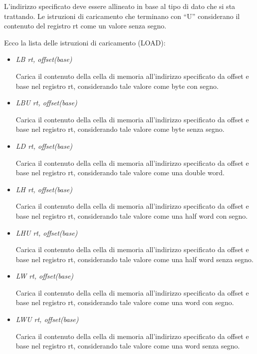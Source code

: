 \documentclass[letterpaper,10pt,english]{sphinxmanual}
\begin{document}
L'indirizzo specificato deve essere allineato in base al tipo di dato che si
sta trattando.  Le istruzioni di caricamento che terminano con ``U'' considerano
il contenuto del registro rt come un valore senza segno.

Ecco la lista delle istruzioni di caricamento (LOAD):
\begin{itemize}
\item {} 
\emph{LB rt, offset(base)}

Carica il contenuto della cella di memoria all'indirizzo specificato da
offset e base nel registro rt, considerando tale valore come byte con segno.

\item {} 
\emph{LBU rt, offset(base)}

Carica il contenuto della cella di memoria all'indirizzo specificato da
offset e base nel registro rt, considerando tale valore come byte senza
segno.

\item {} 
\emph{LD rt, offset(base)}

Carica il contenuto della cella di memoria all'indirizzo specificato da
offset e base nel registro rt, considerando tale valore come una double
word.

\item {} 
\emph{LH rt, offset(base)}

Carica il contenuto della cella di memoria all'indirizzo specificato da
offset e base nel registro rt, considerando tale valore come una half word
con segno.

\item {} 
\emph{LHU rt, offset(base)}

Carica il contenuto della cella di memoria all'indirizzo specificato da
offset e base nel registro rt, considerando tale valore come una half word
senza segno.

\item {} 
\emph{LW rt, offset(base)}

Carica il contenuto della cella di memoria all'indirizzo specificato da
offset e base nel registro rt, considerando tale valore come una word con
segno.

\item {} 
\emph{LWU rt, offset(base)}

Carica il contenuto della cella di memoria all'indirizzo specificato da
offset e base nel registro rt, considerando tale valore come una word senza
segno.

\end{itemize}
\end{document}
